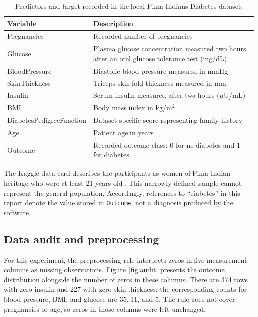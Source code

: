 \documentclass[pdflatex,sn-vancouver-num]{sn-jnl}
\begin{document}
\begin{table}[t]
\caption{Predictors and target recorded in the local Pima Indians Diabetes dataset.}\label{tab:variables}
\centering
\begin{tabular}{@{}p{}p{}@{}}
\toprule
Variable & Description \\
\midrule
Pregnancies & Recorded number of pregnancies \\
Glucose & Plasma glucose concentration measured two hours after an oral glucose tolerance test (mg/dL) \\
BloodPressure & Diastolic blood pressure measured in mmHg \\
SkinThickness & Triceps skin-fold thickness measured in mm \\
Insulin & Serum insulin measured after two hours ($\mu$U/mL) \\
BMI & Body mass index in $\mathrm{kg}/\mathrm{m}^{2}$ \\
DiabetesPedigreeFunction & Dataset-specific score representing family history \\
Age & Patient age in years \\
Outcome & Recorded outcome class: 0 for no diabetes and 1 for diabetes \\
\bottomrule
\end{tabular}
\end{table}

The Kaggle data card describes the participants as women of Pima Indian heritage who were at least 21 years old \cite{uciKagglePima}. This narrowly defined sample cannot represent the general population. Accordingly, references to ``diabetes'' in this report denote the value stored in \texttt{Outcome}, not a diagnosis produced by the software.

\subsection{Data audit and preprocessing}\label{subsec:preprocessing}

For this experiment, the preprocessing rule interprets zeros in five measurement columns as missing observations. Figure~\ref{fig:audit} presents the outcome distribution alongside the number of zeros in these columns. There are 374 rows with zero insulin and 227 with zero skin thickness; the corresponding counts for blood pressure, BMI, and glucose are 35, 11, and 5. The rule does not cover pregnancies or age, so zeros in those columns were left unchanged.
\end{document}
